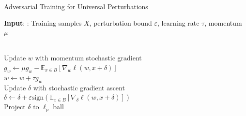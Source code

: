 \documentclass[12pt]{article}
\begin{document}
\begin{algorithm}
\caption{Adversarial Training for Universal Perturbations}\label{Alg_3}

 \textbf{Input}: : Training samples $X$, perturbation bound $\varepsilon$, learning rate $\tau$, momentum $\mu$ \\
\begin{algorithmic}[1]




 \\
\hspace{\algorithmicindent} Update $w$ with momentum stochastic gradient \\
\hspace{\algorithmicindent} \hspace{\algorithmicindent} $g_w \gets \mu g_w - \mathbb{E}_{x \in B} [\nabla_w \ell(w,x+\delta)]$ \\
\hspace{\algorithmicindent} \hspace{\algorithmicindent} $w \gets w + \tau g_w$ \\
\hspace{\algorithmicindent} Update $\delta$ with stochastic gradient ascent \\
\hspace{\algorithmicindent} \hspace{\algorithmicindent} $\delta \gets \delta + \varepsilon \text{sign}(\mathbb{E}_{x \in B}[\nabla_{\delta} \ell(w,x + \delta)])$ \\
\hspace{\algorithmicindent} Project $\delta$ to $\ell_p$ ball


\EndFor
\EndFor
\end{algorithmic}
\end{algorithm}
\end{document}
